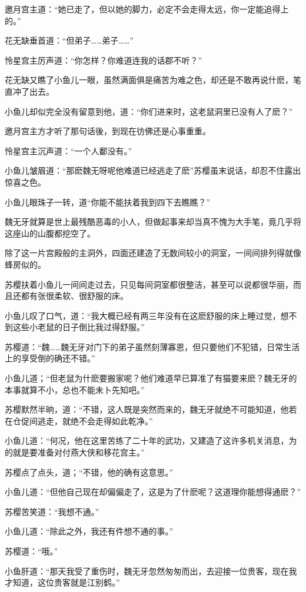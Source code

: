 \documentclass[12pt,oneside]{book}
\begin{document}
邀月宫主道：``她已走了，但以她的脚力，必定不会走得太远，你一定能追得上的。''

花无缺垂首道：``但弟子\ldots\ldots 弟子\ldots\ldots{}''

怜星宫主厉声道：``你怎样？你难道连我的话郡不听？''

花无缺又瞧了小鱼儿一眼，虽然满面俱是痛苦为难之色，却还是不敢再说什麽，笔直冲了出去。

小鱼儿却似完全没有留意到他，道：``你们进来时，这老鼠洞里已没有人了麽？''

邀月宫主方才听了那句话後，到现在彷佛还是心事重重。

怜星宫主沉声道：``一个人鄱没有。''

小鱼儿皱眉道：``那麽魏无呀呢他难道已经逃走了麽''苏樱虽末说话，却忍不住露出惊喜之色。

小鱼儿眼珠子一转，道``你能不能扶着我到四下去瞧瞧？''

魏无牙就算是世上最残酷恶毒的小人，但做起事来却当真不愧为大手笔，竟几乎将这座山的山腹都挖空了。

除了这一片宫殿般的主洞外，四面还建造了无数间较小的洞室，一间间排列得就像蜂房似的。

苏樱扶着小鱼儿一间间走过去，只见每间洞室都很整洁，甚至可以说都很华丽，而且还都有张很柔软、很舒服的床。

小鱼儿叹了口气，道：``我大概已经有两三年没有在这麽舒服的床上睡过觉，想不到这些小老鼠的日子倒比我过得舒服。''

苏樱道：``魏\ldots\ldots 魏无牙对门下的弟子虽然刻薄寡恩，但只要他们不犯错，日常生活上的享受倒的确还不错。''

小鱼儿道；``但老鼠为什麽要搬家呢？他们难道早已算准了有猫要来麽？魏无牙的本事就算不小，总也不能未卜先知吧。''

苏樱默然半晌，道：``不错，这人既是突然而来的，魏无牙就绝不可能知道，他若在仓促间逃走，就绝不会走得如此乾净。''

小鱼儿道：``何况，他在这里苦练了二十年的武功，又建造了这许多机关消息，为的就是要准备对付燕大侠和移花宫主。''

苏樱点了点头，道；``不错，他的确有这意思。''

小鱼儿道：``但他自己现在却偏偏走了，这是为了什麽呢？这道理你能想得通麽？''

苏樱苦笑道：``我想不通。''

小鱼儿道：``除此之外，我还有件想不通的事。''

苏樱道：``哦。''

小鱼肝道：``那天我受了重伤时，魏无牙忽然匆匆而出，去迎接一位贵客，现在我才知道，这位贵客就是江别鹤。''
\end{document}
